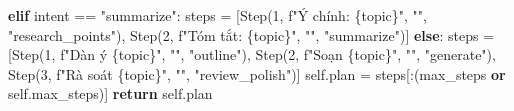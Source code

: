 \documentclass[]{article}
\newenvironment{Shaded}{}{}
\newcommand{\ControlFlowTok}[1]{\textcolor[rgb]{0.00,0.44,0.13}{\textbf{#1}}}
\newcommand{\DecValTok}[1]{\textcolor[rgb]{0.25,0.63,0.44}{#1}}
\newcommand{\KeywordTok}[1]{\textcolor[rgb]{0.00,0.44,0.13}{\textbf{#1}}}
\newcommand{\NormalTok}[1]{#1}
\newcommand{\OperatorTok}[1]{\textcolor[rgb]{0.40,0.40,0.40}{#1}}
\newcommand{\SpecialCharTok}[1]{\textcolor[rgb]{0.25,0.44,0.63}{#1}}
\newcommand{\SpecialStringTok}[1]{\textcolor[rgb]{0.73,0.40,0.53}{#1}}
\newcommand{\StringTok}[1]{\textcolor[rgb]{0.25,0.44,0.63}{#1}}
\newcommand{\VariableTok}[1]{\textcolor[rgb]{0.10,0.09,0.49}{#1}}
\begin{document}
\begin{Shaded}
\begin{Highlighting}[]
            \ControlFlowTok{elif}\NormalTok{ intent }\OperatorTok{==} \StringTok{"summarize"}\NormalTok{: steps }\OperatorTok{=}\NormalTok{ [Step(}\DecValTok{1}\NormalTok{, }\SpecialStringTok{f"Ý chính: }\SpecialCharTok{\{}\NormalTok{topic}\SpecialCharTok{\}}\SpecialStringTok{"}\NormalTok{, }\StringTok{""}\NormalTok{, }\StringTok{"research_points"}\NormalTok{), Step(}\DecValTok{2}\NormalTok{, }\SpecialStringTok{f"Tóm tắt: }\SpecialCharTok{\{}\NormalTok{topic}\SpecialCharTok{\}}\SpecialStringTok{"}\NormalTok{, }\StringTok{""}\NormalTok{, }\StringTok{"summarize"}\NormalTok{)]}
            \ControlFlowTok{else}\NormalTok{: steps }\OperatorTok{=}\NormalTok{ [Step(}\DecValTok{1}\NormalTok{, }\SpecialStringTok{f"Dàn ý }\SpecialCharTok{\{}\NormalTok{topic}\SpecialCharTok{\}}\SpecialStringTok{"}\NormalTok{, }\StringTok{""}\NormalTok{, }\StringTok{"outline"}\NormalTok{), Step(}\DecValTok{2}\NormalTok{, }\SpecialStringTok{f"Soạn }\SpecialCharTok{\{}\NormalTok{topic}\SpecialCharTok{\}}\SpecialStringTok{"}\NormalTok{, }\StringTok{""}\NormalTok{, }\StringTok{"generate"}\NormalTok{), Step(}\DecValTok{3}\NormalTok{, }\SpecialStringTok{f"Rà soát }\SpecialCharTok{\{}\NormalTok{topic}\SpecialCharTok{\}}\SpecialStringTok{"}\NormalTok{, }\StringTok{""}\NormalTok{, }\StringTok{"review_polish"}\NormalTok{)]}
        \VariableTok{self}\NormalTok{.plan }\OperatorTok{=}\NormalTok{ steps[:(max_steps }\KeywordTok{or} \VariableTok{self}\NormalTok{.max_steps)]}
        \ControlFlowTok{return} \VariableTok{self}\NormalTok{.plan}


\end{Highlighting}
\end{Shaded}
\end{document}
